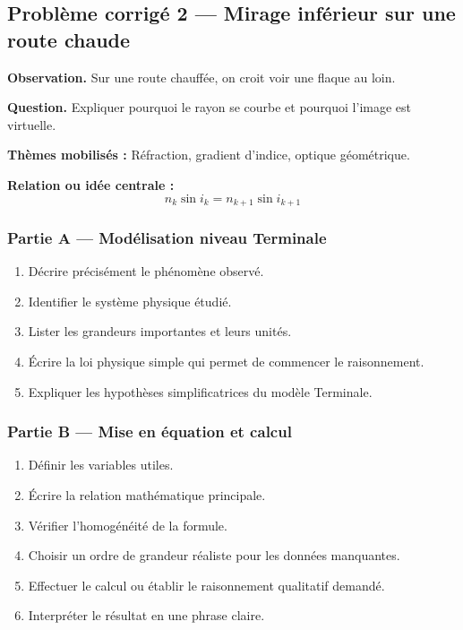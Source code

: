 \documentclass[11pt,a4paper]{article}
\begin{document}
\subsection{Problème corrigé 2 — Mirage inférieur sur une route chaude}

\begin{exercicebox}
\textbf{Observation.} Sur une route chauffée, on croit voir une flaque au loin.

\medskip
\textbf{Question.} Expliquer pourquoi le rayon se courbe et pourquoi l'image est virtuelle.

\medskip
\textbf{Thèmes mobilisés :} Réfraction, gradient d'indice, optique géométrique.

\medskip
\textbf{Relation ou idée centrale :}
\[
n_k\sin i_k=n_{k+1}\sin i_{k+1}
\]
\end{exercicebox}

\subsubsection*{Partie A — Modélisation niveau Terminale}

\begin{enumerate}
  \item Décrire précisément le phénomène observé.
  \item Identifier le système physique étudié.
  \item Lister les grandeurs importantes et leurs unités.
  \item Écrire la loi physique simple qui permet de commencer le raisonnement.
  \item Expliquer les hypothèses simplificatrices du modèle Terminale.
\end{enumerate}

\subsubsection*{Partie B — Mise en équation et calcul}

\begin{enumerate}
  \item Définir les variables utiles.
  \item Écrire la relation mathématique principale.
  \item Vérifier l'homogénéité de la formule.
  \item Choisir un ordre de grandeur réaliste pour les données manquantes.
  \item Effectuer le calcul ou établir le raisonnement qualitatif demandé.
  \item Interpréter le résultat en une phrase claire.
\end{enumerate}
\end{document}
